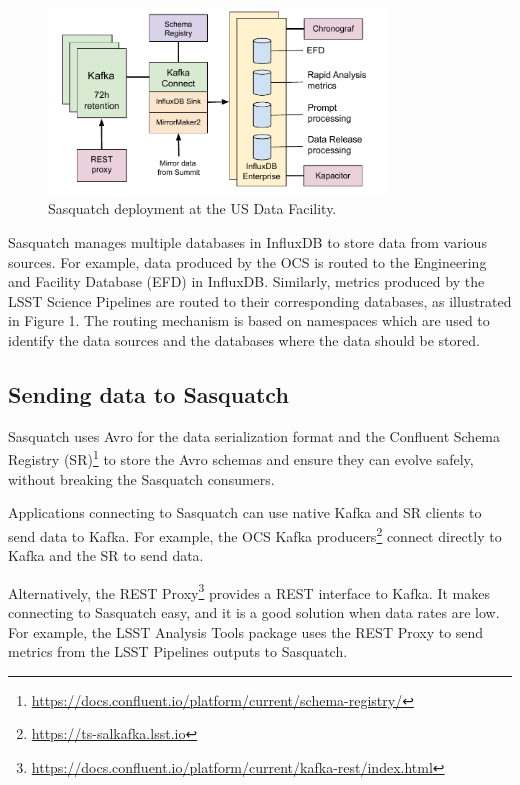 \begin{figure}[h]
    \centering
    \includegraphics[width=0.8\textwidth]{figures/sasquatch-architecture.pdf}
    \caption{Sasquatch deployment at the US Data Facility.}
    \label{fig:system-architecture}

\end{figure}

Sasquatch manages multiple databases in InfluxDB to store data from various sources. For example, data produced by the OCS is routed to the Engineering and Facility Database (EFD) in InfluxDB. Similarly, metrics produced by the LSST Science Pipelines are routed to their corresponding databases, as illustrated in Figure 1. The routing mechanism is based on namespaces which are used to identify the data sources and the databases where the data should be stored.

\subsection{Sending data to Sasquatch}

Sasquatch uses Avro for the data serialization format and the Confluent Schema Registry (SR)\footnote{\url{https://docs.confluent.io/platform/current/schema-registry/}} to store the Avro schemas and ensure they can evolve safely, without breaking the Sasquatch consumers.

Applications connecting to Sasquatch can use native Kafka and SR clients to send data to Kafka. For example, the OCS Kafka producers\footnote{\url{https://ts-salkafka.lsst.io}} connect directly to Kafka and the SR to send data.

Alternatively, the REST Proxy\footnote{\url{https://docs.confluent.io/platform/current/kafka-rest/index.html}} provides a REST interface to Kafka. It makes connecting to Sasquatch easy, and it is a good solution when data rates are low. For example, the LSST Analysis Tools package uses the REST Proxy to send metrics from the LSST Pipelines outputs to Sasquatch.

